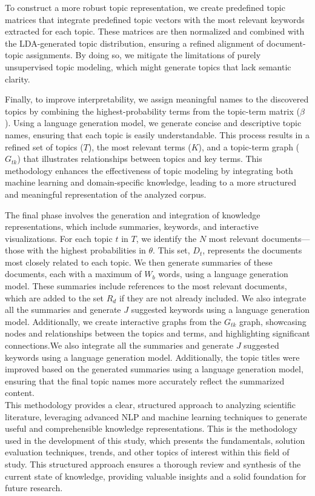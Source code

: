\documentclass[runningheads]{llncs}
\begin{document}
To construct a more robust topic representation, we create predefined topic matrices that integrate predefined topic vectors with the most relevant keywords extracted for each topic. These matrices are then normalized and combined with the LDA-generated topic distribution, ensuring a refined alignment of document-topic assignments. By doing so, we mitigate the limitations of purely unsupervised topic modeling, which might generate topics that lack semantic clarity.

Finally, to improve interpretability, we assign meaningful names to the discovered topics by combining the highest-probability terms from the topic-term matrix ($\beta$). Using a language generation model, we generate concise and descriptive topic names, ensuring that each topic is easily understandable. This process results in a refined set of topics ($T$), the most relevant terms ($K$), and a topic-term graph ($G_{tk}$) that illustrates relationships between topics and key terms. This methodology enhances the effectiveness of topic modeling by integrating both machine learning and domain-specific knowledge, leading to a more structured and meaningful representation of the analyzed corpus.

The final phase involves the generation and integration of knowledge representations, which include summaries, keywords, and interactive visualizations. For each topic $t$ in $T$, we identify the $N$ most relevant documents—those with the highest probabilities in $\theta$. This set, $D_t$, represents the documents most closely related to each topic. We then generate summaries of these documents, each with a maximum of $W_b$ words, using a language generation model. These summaries include references to the most relevant documents, which are added to the set $R_d$ if they are not already included. We also integrate all the summaries and generate $J$ suggested keywords using a language generation model. Additionally, we create interactive graphs from the $G_{tk}$ graph, showcasing nodes and relationships between the topics and terms, and highlighting significant connections.We also integrate all the summaries and generate $J$ suggested keywords using a language generation model. Additionally, the topic titles were improved based on the generated summaries using a language generation model, ensuring that the final topic names more accurately reflect the summarized content.
\\

This methodology provides a clear, structured approach to analyzing scientific literature, leveraging advanced NLP and machine learning techniques to generate useful and comprehensible knowledge representations. This is the methodology used in the development of this study, which presents the fundamentals, solution evaluation techniques, trends, and other topics of interest within this field of study. This structured approach ensures a thorough review and synthesis of the current state of knowledge, providing valuable insights and a solid foundation for future research.
\end{document}
